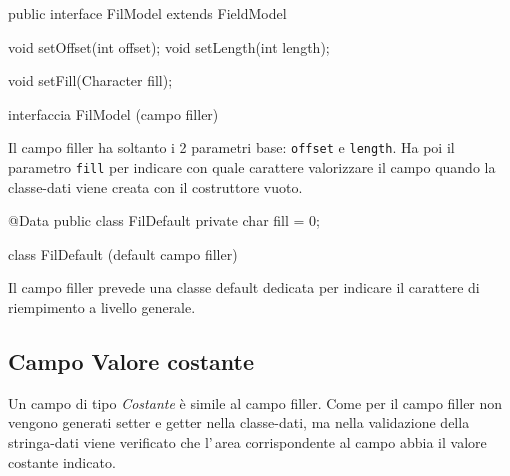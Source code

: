 \documentclass[a4paper,10pt]{report}
\newif\ifesource
\newenvironment{elisting}[1][!htb]
  {\captionsetup{aboveskip=0pt}\begin{listing}[#1]}
  {\end{listing}%
}
\begin{document}
\ifesource
\begin{figure*}[!htb]
\begin{lstlisting}[language=java, 
caption=interfaccia FilModel (campo filler), 
label=lst:FilModel]
public interface FilModel extends FieldModel {
    void setOffset(int offset);
    void setLength(int length);
    
    void setFill(Character fill);
}
\end{lstlisting}\index{FilModel}
\end{figure*}
\else
\begin{elisting}
\begin{javacode}
public interface FilModel extends FieldModel {
    void setOffset(int offset);
    void setLength(int length);
    
    void setFill(Character fill);
}
\end{javacode}
\caption{interfaccia FilModel (campo filler)}
\label{lst:FilModel}
\end{elisting}
\fi

Il campo filler ha soltanto i 2 parametri base: \verb!offset! e \verb!length!.
Ha poi il parametro \verb!fill! per indicare con quale carattere valorizzare il
campo quando la classe-dati viene creata con il costruttore vuoto.

\ifesource
\begin{figure*}[!htb]
\begin{lstlisting}[language=java, 
caption=class FilDefault (default campo filler), 
label=lst:FilDefault]
@Data
public class FilDefault {
    private char fill = 0;
}
\end{lstlisting}\index{FilDefault}
\end{figure*}
\else
\begin{elisting}
\begin{javacode}
@Data
public class FilDefault {
    private char fill = 0;
}
\end{javacode}
\caption{class FilDefault (default campo filler)}
\label{lst:FilDefault}
\end{elisting}
\fi

Il campo filler prevede una classe default dedicata per indicare il carattere di
riempimento a livello generale.

\subsection{Campo Valore costante}
Un campo di tipo \textsl{Costante} è simile al campo filler. Come per il campo
filler non vengono generati setter e getter nella classe-dati, ma nella 
validazione della stringa-dati viene verificato che l'\,area corrispondente al 
campo abbia il valore costante indicato.
\end{document}

